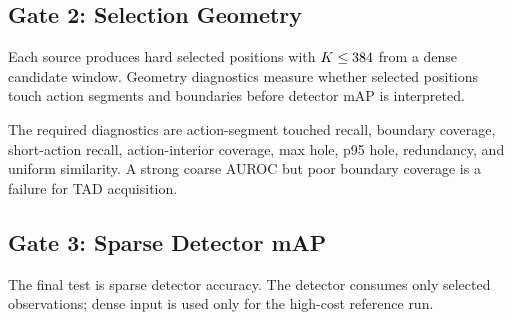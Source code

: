 \subsection{Gate 2: Selection Geometry}

Each source produces hard selected positions with $K\le384$ from a dense
candidate window. Geometry diagnostics measure whether selected positions touch
action segments and boundaries before detector mAP is interpreted.

\begin{table}[t]
\centering
\caption{Selection-geometry diagnostics for hard selected positions.}
\label{tab:selection_geometry}
\setlength{\tabcolsep}{2pt}
\small
{}
\end{table}

The required diagnostics are action-segment touched recall, boundary coverage,
short-action recall, action-interior coverage, max hole, p95 hole, redundancy,
and uniform similarity. A strong coarse AUROC but poor boundary coverage is a
failure for TAD acquisition.

\subsection{Gate 3: Sparse Detector mAP}

The final test is sparse detector accuracy. The detector consumes only selected
observations; dense input is used only for the high-cost reference run.

